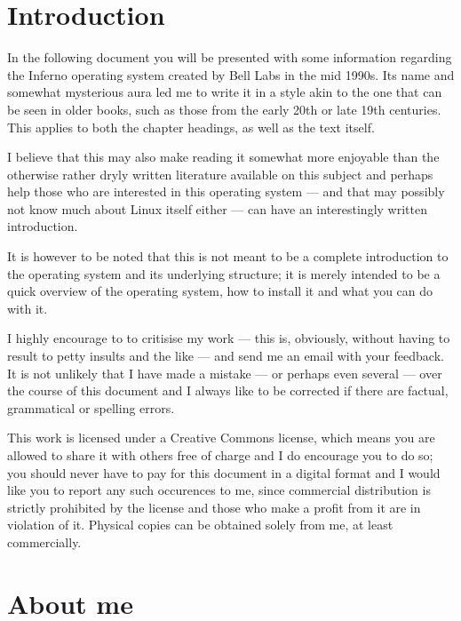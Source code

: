 \documentclass[a5paper,twoside,12pt]{report}
\begin{document}
\tableofcontents


\chapter*{Introduction}
In the following document you will be presented with some information regarding the Inferno operating system created by Bell Labs in the mid 1990s. Its name and somewhat mysterious aura led me to write it in a style akin to the one that can be seen in older books, such as those from the early 20th or late 19th centuries. This applies to both the chapter headings, as well as the text itself.

I believe that this may also make reading it somewhat more enjoyable than the otherwise rather dryly written literature available on this subject and perhaps help those who are interested in this operating system — and that may possibly not know much about Linux itself either — can have an interestingly written introduction.

It is however to be noted that this is not meant to be a complete introduction to the operating system and its underlying structure; it is merely intended to be a quick overview of the operating system, how to install it and what you can do with it.

I highly encourage to to critisise my work — this is, obviously, without having to result to petty insults and the like — and send me an email with your feedback. It is not unlikely that I have made a mistake — or perhaps even several — over the course of this document and I always like to be corrected if there are factual, grammatical or spelling errors.

This work is licensed under a Creative Commons license, which means you are allowed to share it with others free of charge and I do encourage you to do so; you should never have to pay for this document in a digital format and I would like you to report any such occurences to me, since commercial distribution is strictly prohibited by the license and those who make a profit from it are in violation of it. Physical copies can be obtained solely from me, at least commercially. 

\newpage

\chapter*{About me}
\end{document}

